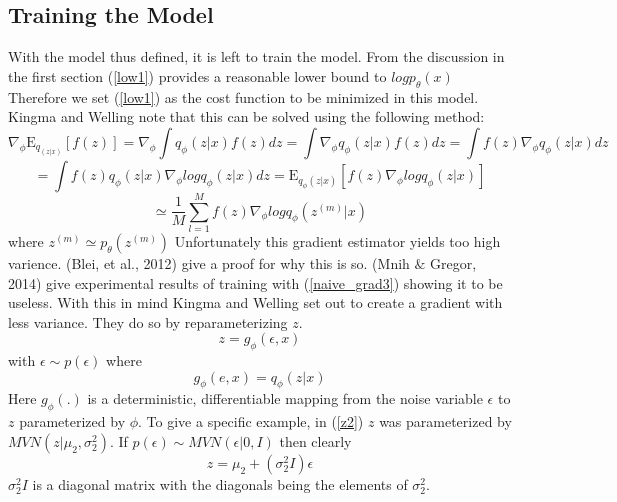 \documentclass[10pt]{article}
\begin{document}
\subsection{Training the Model}
With the model thus defined, it is left to train the model.  From the discussion in the first section
(\ref{low1}) provides a reasonable lower bound to $logp_{\theta}(x)$  Therefore we set 
(\ref{low1}) as the cost function to be minimized in this model.  Kingma and Welling note that
this can be solved using the following method:
\begin{equation}\label{naive_grad}
\nabla_{\phi}\mathrm{E}_{q_(z|x)}[f(z)] = \nabla_{\phi}\int q_{\phi}(z|x)f(z)dz 
=\int  \nabla_{\phi}q_{\phi}(z|x)f(z)dz = \int f(z)\nabla_{\phi}q_{\phi}(z|x)dz
\end{equation}
\begin{equation}\label{naive_grad2}
= \int f(z)q_{\phi}(z|x)\nabla_{\phi}logq_{\phi}(z|x)dz
=\mathrm{E}_{q_{\phi}(z|x)}[f(z)\nabla_{\phi}logq_{\phi}(z|x)]
\end{equation}
\begin{equation} \label{naive_grad3}
\simeq \frac{1}{M}\sum_{l=1}^{M}f(z)\nabla_{\phi}logq_{\phi}(z^{(m)}|x)
\end{equation}
where  $z^{(m)} \simeq p_{\theta}(z^{(m)})$
Unfortunately this gradient estimator yields too high varience. (Blei, et al., 2012)  give a
proof for why this is so. (Mnih $\&$ Gregor, 2014) give experimental results of training with 
(\ref{naive_grad3}) showing it to be useless.  With this in mind Kingma and Welling set out to create 
a gradient with less variance.  They do so by reparameterizing $z$.
\begin{equation} \label{reparam1}
z = g_{\phi}(\epsilon , x)
\end{equation} 
with $\epsilon \sim p(\epsilon)$ where 
\begin{equation}\label{reparam2}
g_{\phi}(e , x) = q_{\phi}(z|x)
\end{equation}
Here $g_{\phi}(.)$ is a deterministic, differentiable mapping from the noise variable $\epsilon$
to $z$ parameterized by $\phi$.  To give a specific example,
in (\ref{z2}) $z$ was parameterized by $MVN(z|\mu_2,\sigma^2_2)$.  If $p(\epsilon) \sim MVN(\epsilon|0,I)$
then clearly 
\begin{equation} \label{map}
z = \mu_2 + (\sigma^2_2I) \epsilon
\end{equation}
$\sigma^2_2I$ is a diagonal matrix with the diagonals being the elements of $\sigma^2_2$.
\end{document}
